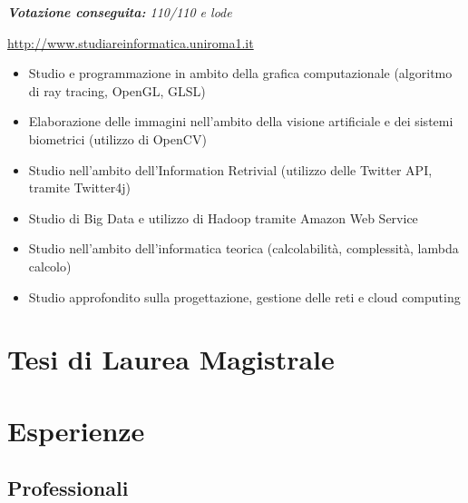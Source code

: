 \documentclass[11pt,a4paper,sans]{moderncv} %
\begin{document}
{
	\newline{}
	\textit{\textbf{Votazione conseguita:} 110/110 e lode}
}
{
	\url{http://www.studiareinformatica.uniroma1.it}
	\begin{itemize}
		\item Studio e programmazione in ambito della grafica computazionale (algoritmo di ray tracing, OpenGL, GLSL)
		\item Elaborazione delle immagini nell'ambito della visione artificiale e dei sistemi biometrici (utilizzo di OpenCV)
		\item Studio nell'ambito dell'Information Retrivial (utilizzo delle Twitter API, tramite Twitter4j)
		\item Studio di Big Data e utilizzo di Hadoop tramite Amazon Web Service
		\item Studio nell'ambito dell'informatica teorica (calcolabilit\`{a}, complessit\`{a}, lambda calcolo)
		\item Studio approfondito sulla progettazione, gestione delle reti e cloud computing
	\end{itemize}
}

\section{Tesi di Laurea Magistrale}



\section{Esperienze}

\subsection{Professionali}
\end{document}
